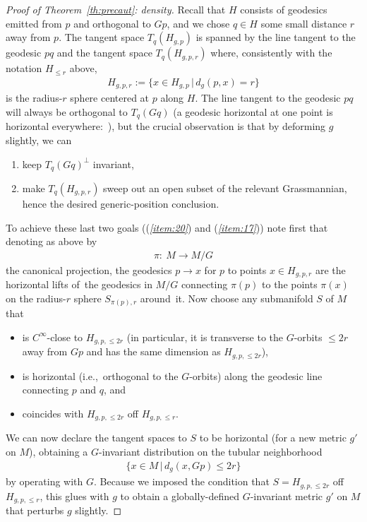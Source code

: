 \documentclass[pdftex]{sigma}%
\numberwithin{equation}{section}
\begin{document}
\begin{proof}[Proof of Theorem~\ref{th:precaut}: density]
 Recall that $H$ consists of geodesics emitted from $p$ and orthogonal to $Gp$, and we chose $q\in H$ some small distance $r$ away from $p$. The tangent space $T_q(H_{g,p})$ is spanned by the line tangent to the geodesic $pq$ and the tangent space $T_q(H_{g,p,r})$ where, consistently with the notation $H_{\le r}$ above,
 \begin{gather*}
 H_{g,p,r}:=\{x\in H_{g,p}\,|\, d_g(p,x)=r\}
 \end{gather*}
 is the radius-$r$ sphere centered at $p$ along $H$. The line tangent to the geodesic $pq$ will always be orthogonal to $T_q(Gq)$ (a geodesic horizontal at one point is horizontal everywhere:~\cite[Lem\-ma~9.44]{bes}), but the crucial observation is that by deforming $g$ slightly, we can
 \begin{enumerate}[$(a)$]\itemsep=0pt
 \item\label{item:20} keep $T_q(Gq)^{\perp}$ invariant,
 \item\label{item:17} make $T_q(H_{g,p,r})$ sweep out an open subset of the relevant Grassmannian, hence the desired generic-position conclusion.
 \end{enumerate}

 To achieve these last two goals (({\it \ref{item:20}}) and ({\it \ref{item:17}})) note first that denoting as above by
 \begin{gather*}
 \pi\colon\ M\to M/G
 \end{gather*}
 the canonical projection, the geodesics $p\to x$ for $p$ to points $x\in H_{g,p,r}$ are the horizontal lifts of~the geodesics in $M/G$ connecting $\pi(p)$ to the points $\pi(x)$ on the radius-$r$ sphere $S_{\pi(p),r}$ around~it. Now choose any submanifold $S$ of $M$ that
 \begin{itemize}\itemsep=0pt
 \item is $C^{\infty}$-close to $H_{g,p,\le 2r}$ (in particular, it is transverse to the $G$-orbits $\le 2r$ away from $Gp$ and has the same dimension as $H_{g,p,\le 2r}$),
 \item is horizontal (i.e.,~orthogonal to the $G$-orbits) along the geodesic line connecting $p$ and $q$, and
 \item coincides with $H_{g,p,\le 2r}$ off $H_{g,p,\le r}$.
 \end{itemize}
 We can now declare the tangent spaces to $S$ to be horizontal (for a new metric $g'$ on $M$), obtaining a $G$-invariant distribution on the tubular neighborhood
 \begin{gather*}
 \{x\in M\,|\, d_g(x,Gp)\le 2r\}
 \end{gather*}
 by operating with $G$. Because we imposed the condition that $S=H_{g,p,\le 2r}$ off $H_{g,p,\le r}$, this glues with $g$ to obtain a globally-defined $G$-invariant metric $g'$ on $M$ that perturbs $g$ slightly.


\end{proof}
\end{document}
